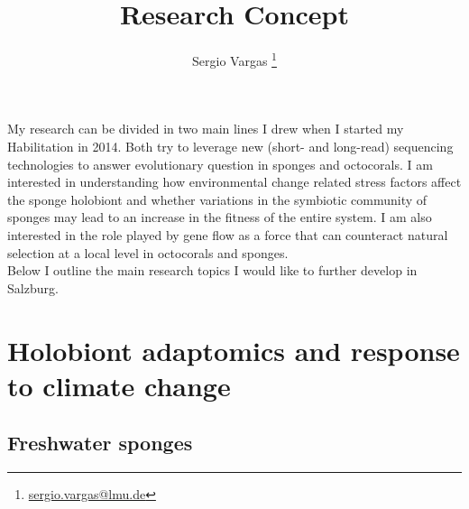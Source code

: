 \documentclass[a4paper,11pt]{article}
\makeatletter
\renewcommand{\maketitle}{\bgroup\setlength{\parindent}{0pt}
\begin{flushleft}
  \thispagestyle{plain}
  \textbf{\@title}

  \@author
\end{flushleft}\egroup
}
\renewenvironment{abstract}
 {\small
  \begin{flushleft}
  \textbf{\abstractname}\vspace{-0.40em}\vspace{0pt}
  \end{flushleft}
  \list{}{
    \setlength{\leftmargin}{0cm}%
    \setlength{\rightmargin}{\leftmargin}%
  }%
  \item\relax}
 {\endlist}
\makeatother
\begin{document}
\title{\Large Research Concept\newline}

\author[1]{Sergio Vargas \footnote[2]{\href{sergio.vargas@lmu.de}{sergio.vargas@lmu.de}}}


\date{}

\maketitle


My research can be divided in two main lines I drew when I started my Habilitation in 2014. Both try to leverage new (short- and long-read) sequencing technologies to answer evolutionary question in sponges and octocorals. I am interested in understanding how environmental change related stress factors affect the sponge holobiont and whether variations in the symbiotic community of sponges may lead to an increase in the fitness of the entire system. I am also interested in the role played by gene flow as a force that can counteract natural selection at a local level in octocorals and sponges.\\

Below I outline the main research topics I would like to further develop in Salzburg.

\section*{Holobiont adaptomics and response to climate change}
\subsection*{Freshwater sponges}
\end{document}
